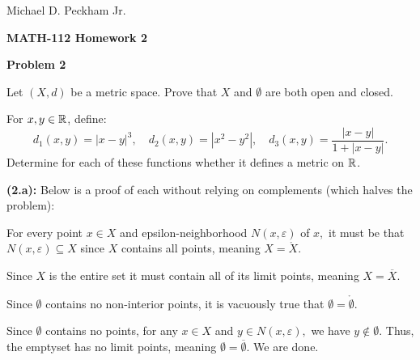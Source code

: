 \documentclass[11pt,letterpaper]{article}
\begin{document}
Michael D. Peckham Jr.

\begin{center}
\textbf{{\Large MATH-112 Homework 2}}\medskip
\end{center}

\begin{mdframed}[style=MyFrame]
\textbf{Problem 2}

\item Let $(X,d)$ be a metric space. Prove that $X$ and $\emptyset$ are both
open and closed.

\item For $x,y\in\mathbb{R}$, define:
    \[
        d_1(x,y)=|x-y|^3,\quad 
        d_2(x,y)=|x^2-y^2|,\quad
        d_3(x,y)=\frac{|x-y|}{1+|x-y|}.
    \]
    Determine for each of these functions whether it defines a metric on $\mathbb{R}$.
\denuma
\end{mdframed}

\textbf{(2.a):} Below is a proof of each without relying on complements (which halves the problem):
    \item For every point $x\in X$ and epsilon-neighborhood $N(x,\varepsilon)$ of $x,$ it must be that $N(x,\varepsilon)\subseteq X$ since $X$ contains all points, meaning $X=\mathring{X}.$
    \item Since $X$ is the entire set it must contain all of its limit points, meaning $X = \overline{X}.$
    \item Since $\emptyset$ contains no non-interior points, it is vacuously true that $\emptyset = \mathring{\emptyset}$.
    \item Since $\emptyset$ contains no points, for any $x\in X$ and $y\in N(x,\varepsilon),$ we have $y\not\in \emptyset.$ 
        Thus, the emptyset has no limit points, meaning $\emptyset = \overline{\emptyset}.$
\denumi
We are done.\\
\rightline{$\square$}
\end{document}
